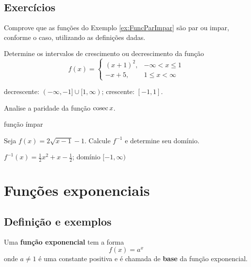 \documentclass[../main.tex]{subfiles}
\begin{document}
\subsection{Exercícios}
\begin{exer}
  Comprove que as funções do Exemplo \ref{ex:FuncParImpar} são par ou impar, conforme o caso, utilizando as definições dadas.
\end{exer}

\begin{exer}
  Determine os intervalos de crescimento ou decrescimento da função
  \begin{equation}
    f(x) = \left\{
      \begin{array}{ll}
        (x+1)^2, & -\infty < x \leq 1\\
        -x+5, & 1 \leq x < \infty
      \end{array}
\right.
  \end{equation}
\end{exer}
\begin{resp}
  decrescente: $(-\infty, -1]\cup [1, \infty)$; crescente: $[-1, 1]$.
\end{resp}

\begin{exer}
  Analise a paridade da função $\operatorname{cosec} x$.
\end{exer}
\begin{resp}
  função ímpar
\end{resp}

\begin{exer}
  Seja $f(x) = 2\sqrt{x-1}-1$. Calcule $f^{-1}$ e determine seu domínio.
\end{exer}
\begin{resp}
  $f^{-1}(x) = \frac{1}{2}x^2 + x - \frac{1}{2}$; domínio $[-1, \infty)$
\end{resp}

\section{Funções exponenciais}\label{sec:Exponencial}
\subsection{Definição e exemplos}
Uma {\bf função exponencial} tem a forma
\begin{equation}
  f(x) = a^x
\end{equation}
onde $a\neq 1$ é uma constante positiva e é chamada de {\bf base} da função exponencial.
\end{document}

